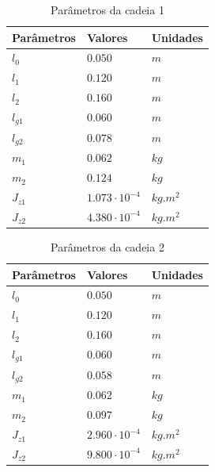 \documentclass[]{politex}
\begin{document}
\begin{table}[H] 
\centering
\caption{Parâmetros da cadeia 1}
\label{parametrosCadeia1}
\begin{tabular}{l|l|l}
Parâmetros   & Valores                  & Unidades      \\ \hline
$l_0$        & $0.050$                     & $m$        \\
$l_1$        & $0.120$                     & $m$        \\
$l_2$        & $0.160$                     & $m$        \\
$l_{g1}$     & $0.060$                     & $m$        \\
$l_{g2}$     & $0.078$                    & $m$        \\
$m_1$        & $0.062$                    & $kg$       \\
$m_2$        & $0.124$                    & $kg$       \\
$J_{z1}$     & $1.073 \cdot 10^{-4}$    & $kg.m^{2}$ \\
$J_{z2}$     & $4.380 \cdot 10^{-4}$    & $kg.m^{2}$ \\
\end{tabular}
\end{table} 

\begin{table}[H] 
\centering
\caption{Parâmetros da cadeia 2}
\label{parametrosCadeia2}
\begin{tabular}{l|l|l}
Parâmetros   & Valores                    & Unidades   \\ \hline
$l_0$        & $0.050$                    & $m$        \\
$l_1$        & $0.120$                    & $m$        \\
$l_2$        & $0.160$                    & $m$        \\
$l_{g1}$     & $0.060$                    & $m$        \\
$l_{g2}$     & $0.058$                    & $m$        \\
$m_1$        & $0.062$                    & $kg$       \\
$m_2$        & $0.097$                    & $kg$       \\
$J_{z1}$     & $2.960   \cdot 10^{-4}$    & $kg.m^{2}$ \\
$J_{z2}$     & $9.800   \cdot 10^{-4}$    & $kg.m^{2}$ \\
\end{tabular}
\end{table}
\end{document}
